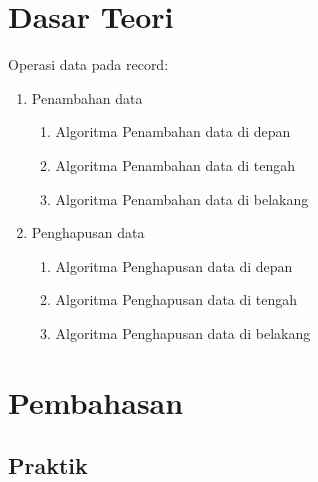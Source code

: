 \documentclass[a4paper,12pt]{article}
\begin{document}
\section{Dasar Teori}
Operasi data pada record:
\begin{enumerate}
   \item Penambahan data
       \begin{enumerate}
          \item Algoritma Penambahan data di depan 
          \item Algoritma Penambahan data di tengah 
          \item Algoritma Penambahan data di belakang 
       \end{enumerate}
   \item Penghapusan data
       \begin{enumerate}
          \item Algoritma Penghapusan data di depan 
          \item Algoritma Penghapusan data di tengah 
          \item Algoritma Penghapusan data di belakang 
       \end{enumerate}
\end{enumerate}

\newpage

\section{Pembahasan}
\subsection{Praktik}
\end{document}
